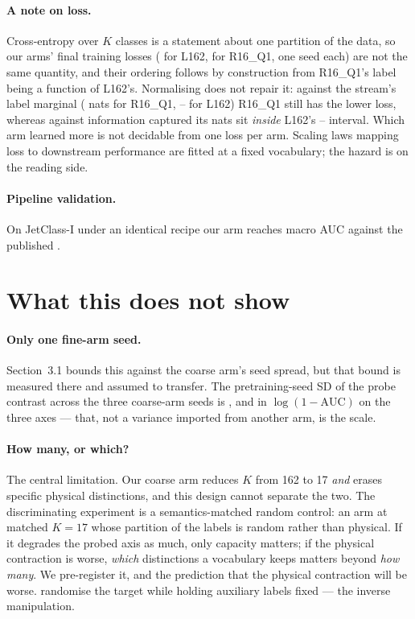 \documentclass{article}
\begin{document}
\paragraph{A note on loss.} Cross-entropy over $K$ classes is a statement about
one partition of the data, so our arms' final training losses (\LossLsixtwo{}
for L162, \LossRsixteen{} for R16\_Q1, one seed each) are not the same quantity,
and their ordering
follows by construction from R16\_Q1's label being a function of L162's.
Normalising does not repair it: against the stream's label marginal
(\HyRsixteen{} nats for R16\_Q1, \HyLsixtwoLo{}--\HyLsixtwoHi{} for L162)
R16\_Q1 still has the lower loss, whereas against information captured its
\InfoRsixteen{} nats sit \emph{inside} L162's
\InfoLsixtwoLo{}--\InfoLsixtwoHi{} interval. Which arm learned more is not
decidable from one loss per arm. Scaling laws mapping loss to downstream
performance \citep{scaling} are fitted at a fixed vocabulary; the hazard is on
the reading side.

\paragraph{Pipeline validation.} On JetClass-I under an identical recipe our
arm reaches macro AUC \ePartOurs{} against the published \ePartPub{}
\citep{part}.

\section{What this does not show}

\paragraph{Only one fine-arm seed.} Section~3.1 bounds this against the coarse
arm's seed spread, but that bound is measured there and assumed to transfer. The
pretraining-seed SD of the probe contrast across the three coarse-arm seeds is
\seedSDres{}, \seedSDqcd{} and \seedSDtop{} in $\log(1-\mathrm{AUC})$ on the
three axes --- that, not a variance imported from another arm, is the scale.

\paragraph{How many, or which?} The central limitation. Our coarse arm reduces
$K$ from 162 to 17 \emph{and} erases specific physical distinctions, and this
design cannot separate the two. The discriminating experiment is a
semantics-matched random control: an arm at matched $K=17$ whose partition of the
\Nnative{} labels is random rather than physical. If it degrades the probed axis
as much, only capacity matters; if the physical contraction is worse,
\emph{which} distinctions a vocabulary keeps matters beyond \emph{how many}. We
pre-register it, and the prediction that the physical contraction will be worse.
\citet{chen} randomise the target while holding auxiliary labels fixed --- the
inverse manipulation.
\end{document}

